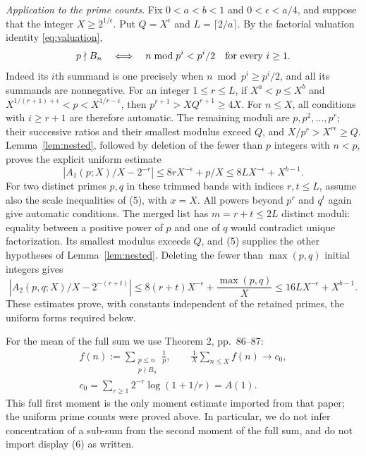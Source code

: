 \documentclass[10pt]{article}
\theoremstyle{remark}
\begin{document}
\emph{Application to the prime counts.}
Fix $0<a<b<1$ and $0<\epsilon<a/4$, and suppose that the integer
$X\geq2^{1/\epsilon}$. Put $Q=X^\epsilon$ and $L=\lceil2/a\rceil$.
By the factorial valuation identity \eqref{eq:valuation},
\[
 p\nmid B_n\quad\Longleftrightarrow\quad
 n\bmod p^i<p^i/2\quad\hbox{for every }i\geq1.
\]
Indeed its $i$th summand is one precisely when
$n\bmod p^i\geq p^i/2$, and all its summands are nonnegative.
For an integer $1\leq r\leq L$, if $X^a<p\leq X^b$ and
$X^{1/(r+1)+\epsilon}<p<X^{1/r-\epsilon}$, then
$p^{r+1}>XQ^{r+1}\geq4X$. For $n\leq X$, all conditions with
$i\geq r+1$ are therefore automatic. The remaining moduli are
$p,p^2,\ldots,p^r$; their successive ratios and their smallest modulus
exceed $Q$, and $X/p^r>X^{r\epsilon}\geq Q$.
Lemma~\ref{lem:nested}, followed by deletion of the fewer than $p$
integers with $n<p$, proves the explicit uniform estimate
\begin{equation}\label{eq:uniform1}
 \left|A_1(p;X)/X-2^{-r}\right|
 \leq8rX^{-\epsilon}+p/X\leq8LX^{-\epsilon}+X^{b-1}.
\end{equation}
For two distinct primes $p,q$ in these trimmed bands with indices
$r,t\leq L$, assume also the scale inequalities of (5), with $x=X$.
All powers beyond $p^r$ and $q^t$ again give automatic conditions.
The merged list has $m=r+t\leq2L$ distinct moduli: equality between
a positive power of $p$ and one of $q$ would contradict unique
factorization. Its smallest modulus exceeds $Q$, and (5) supplies
the other hypotheses of Lemma~\ref{lem:nested}. Deleting the fewer
than $\max(p,q)$ initial integers gives
\begin{equation}\label{eq:uniform2}
 \left|A_2(p,q;X)/X-2^{-(r+t)}\right|
 \leq8(r+t)X^{-\epsilon}+\frac{\max(p,q)}X
 \leq16LX^{-\epsilon}+X^{b-1}.
\end{equation}
These estimates prove, with constants independent of the retained
primes, the uniform forms required below.

For the mean of the full sum we use Theorem 2, pp.~86--87:
\begin{equation}\label{eq:inputmean}
 \begin{gathered}
 f(n):=\sum_{\substack{p\leq n\\p\nmid B_n}}\frac1p,\qquad
 \frac1X\sum_{n\leq X}f(n)\longrightarrow c_0,\\
 c_0=\sum_{r\geq1}2^{-r}\log(1+1/r)=A(1).
 \end{gathered}
\end{equation}
This full first moment is the only moment estimate imported from that
paper; the uniform prime counts were proved above. In particular, we
do not infer concentration of a sub-sum from the second
moment of the full sum, and do not import display (6) as written.
\end{document}
